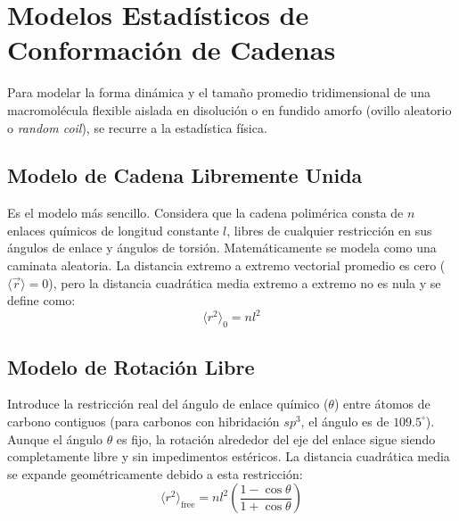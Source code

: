 \section{Modelos Estadísticos de Conformación de Cadenas}

Para modelar la forma dinámica y el tamaño promedio tridimensional de una macromolécula flexible aislada en disolución o en fundido amorfo (ovillo aleatorio o \textit{random coil}), se recurre a la estadística física.

\subsection{Modelo de Cadena Libremente Unida}
Es el modelo más sencillo. Considera que la cadena polimérica consta de $n$ enlaces químicos de longitud constante $l$, libres de cualquier restricción en sus ángulos de enlace y ángulos de torsión. Matemáticamente se modela como una caminata aleatoria. La distancia extremo a extremo vectorial promedio es cero ($\langle \vec{r} \rangle = 0$), pero la distancia cuadrática media extremo a extremo no es nula y se define como:
\begin{equation}
    \langle r^2 \rangle_0 = n l^2
    \label{eq:enlace_libre}
\end{equation}

\subsection{Modelo de Rotación Libre}
Introduce la restricción real del ángulo de enlace químico ($\theta$) entre átomos de carbono contiguos (para carbonos con hibridación $sp^3$, el ángulo es de $109.5^\circ$). Aunque el ángulo $\theta$ es fijo, la rotación alrededor del eje del enlace sigue siendo completamente libre y sin impedimentos estéricos. La distancia cuadrática media se expande geométricamente debido a esta restricción:
\begin{equation}
    \langle r^2 \rangle_{\text{free}} = n l^2 \left( \frac{1 - \cos\theta}{1 + \cos\theta} \right)
    \label{eq:rotacion_libre}
\end{equation}

